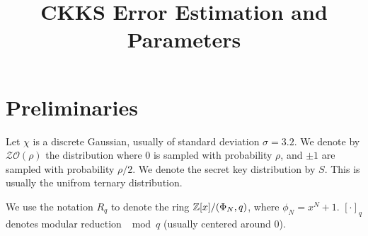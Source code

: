\documentclass[a4paper,10pt]{article}
\title{CKKS Error Estimation and Parameters}
\author{}
\date{}
\begin{document}

\maketitle

\section{Preliminaries}
Let $\chi$ is a discrete Gaussian, usually of standard
deviation $\sigma = 3.2$. We denote by $\mathcal{ZO}(\rho)$ the distribution where $0$ is 
sampled with probability $\rho$, and $\pm 1$ are sampled with probability $\rho/2$.
We denote the secret key distribution by $S$. This is usually the unifrom ternary distribution. 

We use the notation $R_q$ to denote the ring $\mathbb{Z}[x]/(\Phi_N, q)$, where
$\phi_N = x^N + 1$. $[\cdot]_q$ denotes modular reduction $\mod q$ (usually centered around 0).
\end{document}
